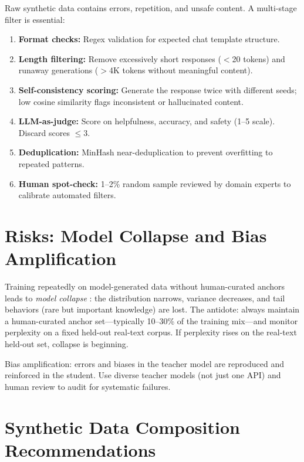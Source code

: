 Raw synthetic data contains errors, repetition, and unsafe content. A multi-stage filter is essential:

\begin{enumerate}
  \item \textbf{Format checks:} Regex validation for expected chat template structure.
  \item \textbf{Length filtering:} Remove excessively short responses ($<$20 tokens) and runaway generations ($>$4K tokens without meaningful content).
  \item \textbf{Self-consistency scoring:} Generate the response twice with different seeds; low cosine similarity flags inconsistent or hallucinated content.
  \item \textbf{LLM-as-judge:} Score on helpfulness, accuracy, and safety (1--5 scale). Discard scores $\leq$3.
  \item \textbf{Deduplication:} MinHash near-deduplication to prevent overfitting to repeated patterns.
  \item \textbf{Human spot-check:} 1--2\% random sample reviewed by domain experts to calibrate automated filters.
\end{enumerate}

\section{Risks: Model Collapse and Bias Amplification}

\begin{warningbox}
Training repeatedly on model-generated data without human-curated anchors leads to \emph{model collapse} \parencite{shumailov2024ai}: the distribution narrows, variance decreases, and tail behaviors (rare but important knowledge) are lost. The antidote: always maintain a human-curated anchor set---typically 10--30\% of the training mix---and monitor perplexity on a fixed held-out real-text corpus. If perplexity rises on the real-text held-out set, collapse is beginning.
\end{warningbox}

Bias amplification: errors and biases in the teacher model are reproduced and reinforced in the student. Use diverse teacher models (not just one API) and human review to audit for systematic failures.

\section{Synthetic Data Composition Recommendations}

